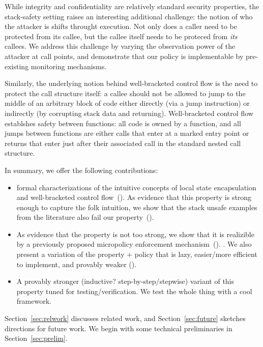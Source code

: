 \documentclass[acmsmall,review,anonymous]{acmart}\settopmatter{printfolios=true,printccs=false,printacmref=false}
\begin{document}
While integrity and confidentiality are relatively standard security
properties, the stack-safety setting raises an interesting additional
challenge:
the notion of who the attacker is shifts throught execution. Not only
does a caller need to be protected from its callee, but the callee
itself needs to be proteced from {\em its} callees.
We address this challenge by varying the observation power
of the attacker at call points, and demonstrate that our policy is
implementable by pre-existing monitoring mechanisms. 

Similarly, the underlying notion behind well-bracketed control flow is
the need to protect the call structure itself: a callee should not be
allowed to jump to the middle of an arbitrary block of code either
directly (via a jump instruction) or indirectly (by corrupting stack
data and returning). Well-bracketed control flow establshes safety between
functions: all code is owned by a function, and all jumps between functions
are either calls that enter at a marked entry point or returns that enter
just after their associated call in the standard nested call structure.


In summary, we offer the following contributions:
\begin{itemize}
\item {} formal characterizations of the
  intuitive concepts of local state encapsulation and
  well-bracketed control flow~().  As evidence that this
  property is strong enough to capture the folk intuition, we show
  that the stack unsafe examples from the literature also fail our
  property~().
\item As evidence that the property is not too strong, we show that it is
  realizible by
  a previously proposed micropolicy enforcement
  mechanism~(). . We also present a variation of the
  property + policy that is lazy, easier/more efficient to implement,
  and provably weaker ().
\item A provably stronger (inductive? step-by-step/stepwise) variant
  of this property tuned for testing/verification.  We test the whole
  thing with a cool framework. 
\end{itemize}
Section~\ref{sec:relwork} discusses related work, and
Section~\ref{sec:future} sketches directions for future work.
%
We begin with some technical preliminaries in
Section~\ref{sec:prelim}.
\end{document}
